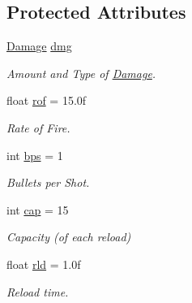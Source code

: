 \subsection*{Protected Attributes}
\begin{DoxyCompactItemize}
\item 
\mbox{\label{class_gun_a5481e6bb628664365fb1ba7a0824a01c}} 
\mbox{\hyperlink{struct_damage}{Damage}} \mbox{\hyperlink{class_gun_a5481e6bb628664365fb1ba7a0824a01c}{dmg}}
\begin{DoxyCompactList}\small\item\em Amount and Type of \mbox{\hyperlink{struct_damage}{Damage}}. \end{DoxyCompactList}\item 
\mbox{\label{class_gun_adff37bcbb22b1c9b491c99e6f19725b8}} 
float \mbox{\hyperlink{class_gun_adff37bcbb22b1c9b491c99e6f19725b8}{rof}} = 15.\+0f
\begin{DoxyCompactList}\small\item\em Rate of Fire. \end{DoxyCompactList}\item 
\mbox{\label{class_gun_a0f6ccc7fb0967e602cafc50cbca16739}} 
int \mbox{\hyperlink{class_gun_a0f6ccc7fb0967e602cafc50cbca16739}{bps}} = 1
\begin{DoxyCompactList}\small\item\em Bullets per Shot. \end{DoxyCompactList}\item 
\mbox{\label{class_gun_a9faf44f744bfe61a86f6c3c31dbfc5ce}} 
int \mbox{\hyperlink{class_gun_a9faf44f744bfe61a86f6c3c31dbfc5ce}{cap}} = 15
\begin{DoxyCompactList}\small\item\em Capacity (of each reload) \end{DoxyCompactList}\item 
\mbox{\label{class_gun_a7ad3e85b508fbef6053101a91acff4a2}} 
float \mbox{\hyperlink{class_gun_a7ad3e85b508fbef6053101a91acff4a2}{rld}} = 1.\+0f
\begin{DoxyCompactList}\small\item\em Reload time. \end{DoxyCompactList}\item 
\mbox{\label{class_gun_a26f76c6539061bfbf4a517a35f289d10}} 

\end{DoxyCompactItemize}
